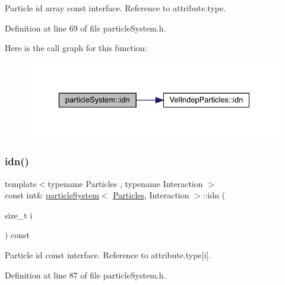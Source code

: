 Particle id array const interface. Reference to attribute.\+type. 



Definition at line 69 of file particle\+System.\+h.

Here is the call graph for this function\+:\nopagebreak
\begin{figure}[H]
\begin{center}
\leavevmode
\includegraphics[width=329pt]{classparticle_system_a551d6833ec7b1f42a0d2c6b8ad0b3ddb_cgraph}
\end{center}
\end{figure}
\mbox{\label{classparticle_system_a1d809808c2eaeeaa2e58b8fcf0aa5789}} 
\subsubsection{\texorpdfstring{idn()}{idn()}\hspace{0.1cm}{\footnotesize\ttfamily [2/2]}}
{\footnotesize\ttfamily template$<$typename Particles , typename Interaction $>$ \\
const int\& \mbox{\hyperlink{classparticle_system}{particle\+System}}$<$ \mbox{\hyperlink{struct_particles}{Particles}}, Interaction $>$\+::idn (\begin{DoxyParamCaption}\item[{size\+\_\+t}]{i }\end{DoxyParamCaption}) const\hspace{0.3cm}{\ttfamily [inline]}}



Particle id const interface. Reference to attribute.\+type\mbox{[}i\mbox{]}. 



Definition at line 87 of file particle\+System.\+h.

